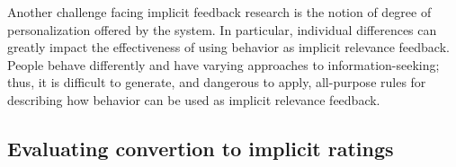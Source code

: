 Another challenge facing implicit feedback research is the notion of degree of
personalization offered by the system. In particular, individual differences
can greatly impact the effectiveness of using behavior as implicit relevance
feedback. People behave differently and have varying approaches to
information-seeking; thus, it is difficult to generate, and dangerous to apply,
all-purpose rules for describing how behavior can be used as implicit relevance
feedback.



\subsection{Evaluating convertion to implicit ratings}

